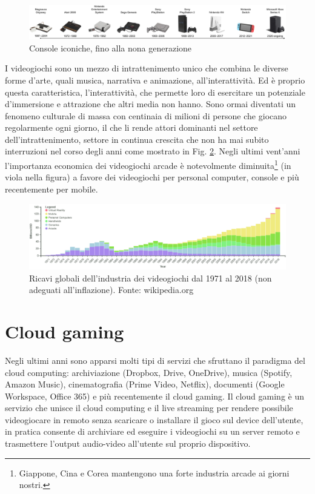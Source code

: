 \begin{figure}[H]
	\includegraphics[width=\linewidth]{immagini/consoles_history}
	\caption{Console iconiche, fino alla nona generazione}
	\label{fig:consoles_history}
\end{figure}

I videogiochi sono un mezzo di intrattenimento unico che combina le diverse forme d'arte, quali musica, narrativa e animazione, all'interattività. Ed è proprio questa caratteristica, l'interattività, che permette loro di esercitare un potenziale d'immersione e attrazione che altri media non hanno. Sono ormai diventati un fenomeno culturale di massa con centinaia di milioni di persone che giocano regolarmente ogni giorno, il che li rende attori dominanti nel settore dell'intrattenimento, settore in continua crescita che non ha mai subito interruzioni nel corso degli anni come mostrato in Fig. \ref{fig:valore_commerciale_giochi_globale}. Negli ultimi vent'anni l'importanza economica dei videogiochi arcade è notevolmente diminuita\footnote{Giappone, Cina e Corea mantengono una forte industria arcade ai giorni nostri.} (in viola nella figura) a favore dei videogiochi per personal computer, console e più recentemente per mobile.

\begin{figure}[H]
	\includegraphics[width=\linewidth]{immagini/valore_commerciale_giochi_globale.png}
	\caption{Ricavi globali dell'industria dei videogiochi dal 1971 al 2018 (non adeguati all'inflazione). Fonte: wikipedia.org}
	\label{fig:valore_commerciale_giochi_globale}
\end{figure}



\section{Cloud gaming}
Negli ultimi anni sono apparsi molti tipi di servizi che sfruttano il paradigma del cloud computing: archiviazione (Dropbox, Drive, OneDrive), musica (Spotify, Amazon Music), cinematografia (Prime Video, Netflix), documenti (Google Workspace, Office 365) e più recentemente il cloud gaming. Il cloud gaming è un servizio che unisce il cloud computing e il live streaming per rendere possibile videogiocare in remoto senza scaricare o installare il gioco sul device dell'utente, in pratica consente di archiviare ed eseguire i videogiochi su un server remoto e trasmettere l'output audio-video all'utente sul proprio dispositivo.

